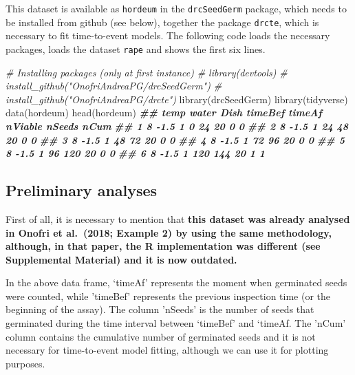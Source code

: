 \documentclass[
]{book}
\newenvironment{Shaded}{\begin{snugshade}}{\end{snugshade}}
\newcommand{\CommentTok}[1]{\textcolor[rgb]{0.56,0.35,0.01}{\textit{#1}}}
\newcommand{\DocumentationTok}[1]{\textcolor[rgb]{0.56,0.35,0.01}{\textbf{\textit{#1}}}}
\newcommand{\FunctionTok}[1]{\textcolor[rgb]{0.00,0.00,0.00}{#1}}
\newcommand{\NormalTok}[1]{#1}
\begin{document}
This dataset is available as \texttt{hordeum} in the \texttt{drcSeedGerm} package, which needs to be installed from github (see below), together the package \texttt{drcte}, which is necessary to fit time-to-event models. The following code loads the necessary packages, loads the dataset \texttt{rape} and shows the first six lines.

\begin{Shaded}
\begin{Highlighting}[]
\CommentTok{\# Installing packages (only at first instance)}
\CommentTok{\# library(devtools)}
\CommentTok{\# install\_github("OnofriAndreaPG/drcSeedGerm")}
\CommentTok{\# install\_github("OnofriAndreaPG/drcte")}
\FunctionTok{library}\NormalTok{(drcSeedGerm)}
\FunctionTok{library}\NormalTok{(tidyverse)}
\FunctionTok{data}\NormalTok{(hordeum)}
\FunctionTok{head}\NormalTok{(hordeum)}
\DocumentationTok{\#\#   temp water Dish timeBef timeAf nViable nSeeds nCum}
\DocumentationTok{\#\# 1    8  {-}1.5    1       0     24      20      0    0}
\DocumentationTok{\#\# 2    8  {-}1.5    1      24     48      20      0    0}
\DocumentationTok{\#\# 3    8  {-}1.5    1      48     72      20      0    0}
\DocumentationTok{\#\# 4    8  {-}1.5    1      72     96      20      0    0}
\DocumentationTok{\#\# 5    8  {-}1.5    1      96    120      20      0    0}
\DocumentationTok{\#\# 6    8  {-}1.5    1     120    144      20      1    1}
\end{Highlighting}
\end{Shaded}

\hypertarget{preliminary-analyses}{%
\subsection{Preliminary analyses}\label{preliminary-analyses}}

First of all, it is necessary to mention that \textbf{this dataset was already analysed in Onofri et al.~(2018; Example 2) by using the same methodology, although, in that paper, the R implementation was different (see Supplemental Material) and it is now outdated.}

In the above data frame, `timeAf' represents the moment when germinated seeds were counted, while 'timeBef' represents the previous inspection time (or the beginning of the assay). The column 'nSeeds' is the number of seeds that germinated during the time interval between `timeBef' and `timeAf. The 'nCum' column contains the cumulative number of germinated seeds and it is not necessary for time-to-event model fitting, although we can use it for plotting purposes.
\end{document}
